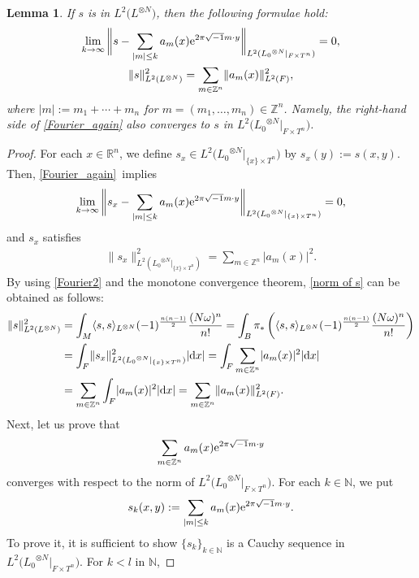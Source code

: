 \documentclass[pdftex]{sigma}
\numberwithin{equation}{section}
\newtheorem{Lemma}[Theorem]{Lemma}
\newcommand{\R}{\mathbb{R}}
\newcommand{\Z}{\mathbb{Z}}
\newcommand{\N}{\mathbb{N}}
\newcommand{\abs}[1]{\lvert#1\rvert}
\newcommand{\norm}[1]{\lVert#1\rVert}
\begin{document}
\begin{Lemma}\label{convergence in F times T}
If $s$ is in $L^2\bigl(L^{\otimes N}\bigr)$, then the following formulae hold:
\begin{gather}
 \lim_{k\to \infty}\bigg\lVert s-\sum_{\abs{m}\le k}a_m(x){\rm e}^{2\pi\sqrt{-1}m\cdot y}\bigg\rVert_{L^2({L_0}^{\otimes N}|_{F\times T^n})}=0, \label{Fourier series for s}\nonumber\\
\norm{s}_{L^2(L^{\otimes N})}^2=\sum_{m\in \Z^n}\norm{a_m(x)}_{L^2(F)}^2,\label{norm of s}
\end{gather}
where $\abs{m}:=m_1+\cdots +m_n$ for $m=(m_1,\ldots ,m_n)\in \Z^n$. Namely, the right-hand side of \eqref{Fourier_again} also converges to $s$ in $L^2\bigl({L_0}^{\otimes N}|_{F\times T^n}\bigr)$.
\end{Lemma}
\begin{proof}
For each $x\in \R^n$, we define $s_x\in L^2\bigl({L_0}^{\otimes N}|_{\{x\}\times T^n}\bigr)$ by $s_x(y):=s(x,y)$. Then, \eqref{Fourier_again}~implies
\begin{gather}
\lim_{k\to \infty}\bigg\lVert s_x-\sum_{\abs{m}\le k}a_m(x){\rm e}^{2\pi\sqrt{-1}m\cdot y}\bigg\rVert_{L^2({L_0}^{\otimes N}|_{\{x\}\times T^n})}=0, \label{Fourier1}
\end{gather}
and $s_x$ satisfies
\begin{gather}
\norm{s_x}_{L^2({L_0}^{\otimes N}|_{\{x\}\times T^n})}^2=\sum_{m\in \Z^n}\abs{a_m(x)}^2.\label{Fourier2}
\end{gather}
By using \eqref{Fourier2} and the monotone convergence theorem, \eqref{norm of s} can be obtained as follows:
\begin{align*}
\norm{s}_{L^2(L^{\otimes N})}^2&=\int_M\langle s, s\rangle_{L^{\otimes N}} (-1)^{\frac{n(n-1)}{2}}\dfrac{(N\omega)^n}{n!}=\int_B\pi_*\left(\langle s, s\rangle_{L^{\otimes N}} (-1)^{\frac{n(n-1)}{2}}\dfrac{(N\omega)^n}{n!}\right) \\
&=\int_F\norm{s_x}_{L^2({L_0}^{\otimes N}|_{\{x\}\times T^n})}^2\abs{{\rm d}x} =\int_F\sum_{m\in \Z^n}\abs{a_m(x)}^2\abs{{\rm d}x} \\
&=\sum_{m\in \Z^n}\int_F\abs{a_m(x)}^2\abs{{\rm d}x} =\sum_{m\in \Z^n}\norm{a_m(x)}_{L^2(F)}^2.
\end{align*}
Next, let us prove that
\[\sum_{m\in \Z^n}a_m(x){\rm e}^{2\pi\sqrt{-1}m\cdot y}
\]
 converges with respect to the norm of $L^2\bigl({L_0}^{\otimes N}|_{F\times T^n}\bigr)$. For each $k\in \N$, we put
 \[s_k(x,y):=\sum_{\abs{m}\le k}a_m(x){\rm e}^{2\pi\sqrt{-1}m\cdot y}.
 \]
 To prove it, it is sufficient to show $\{s_k\}_{k\in \N}$ is a Cauchy sequence in $L^2\bigl({L_0}^{\otimes N}|_{F\times T^n}\bigr)$. For $k<l$ in $\N$,

\end{proof}
\end{document}
